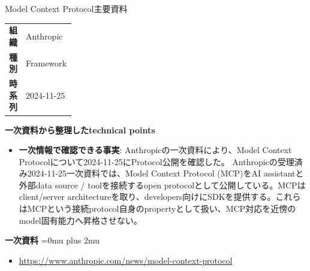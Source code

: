 \begin{technicalnote}{Model Context Protocol}{主要資料}
\begingroup
\begin{tabularx}{\linewidth}{@{}>{\bfseries}p{0.22\linewidth}X@{}}
組織 & Anthropic \\
種別 & Framework \\
時系列 & 2024-11-25 \\
\end{tabularx}
\smallskip
{\bfseries 一次資料から整理したtechnical points}
\begin{itemize}[leftmargin=1.5em,itemsep=0.35em]
\item \textbf{一次情報で確認できる事実}: Anthropicの一次資料により、Model Context Protocolについて2024-11-25にProtocol公開を確認した。 Anthropicの受理済み2024-11-25一次資料では、Model Context Protocol (MCP)をAI assistantと外部data source / toolを接続するopen protocolとして公開している。MCPはclient/server architectureを取り、developers向けにSDKを提供する。これらはMCPという接続protocol自身のpropertyとして扱い、MCP対応を近傍のmodel固有能力へ昇格させない。
\end{itemize}
\begin{minipage}{\linewidth}
\begin{samepage}
{\bfseries 一次資料}
\begingroup\sloppy
\Urlmuskip=0mu plus 2mu\relax
\begin{itemize}[leftmargin=1.5em,itemsep=0.25em]
\item {\scriptsize\url{https://www.anthropic.com/news/model-context-protocol}}
\end{itemize}
\endgroup
\end{samepage}
\end{minipage}
\endgroup
\end{technicalnote}
\medskip

